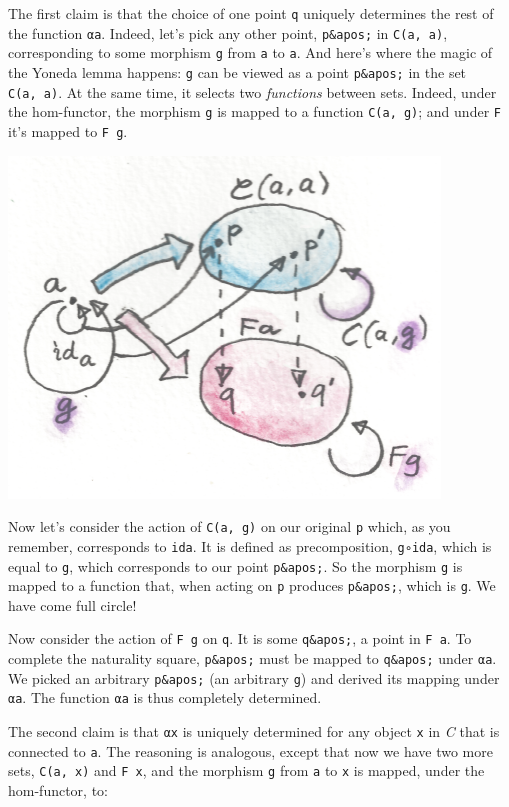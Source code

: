 The first claim is that the choice of one point \texttt{q} uniquely
determines the rest of the function \texttt{αa}. Indeed, let's pick any
other point, \texttt{p\&apos;} in \texttt{C(a,\ a)}, corresponding to
some morphism \texttt{g} from \texttt{a} to \texttt{a}. And here's where
the magic of the Yoneda lemma happens: \texttt{g} can be viewed as a
point \texttt{p\&apos;} in the set \texttt{C(a,\ a)}. At the same time,
it selects two \emph{functions} between sets. Indeed, under the
hom-functor, the morphism \texttt{g} is mapped to a function
\texttt{C(a,\ g)}; and under \texttt{F} it's mapped to \texttt{F\ g}.

\includegraphics{images/yoneda4.png}

Now let's consider the action of \texttt{C(a,\ g)} on our original
\texttt{p} which, as you remember, corresponds to \texttt{ida}. It is
defined as precomposition, \texttt{g∘ida}, which is equal to \texttt{g},
which corresponds to our point \texttt{p\&apos;}. So the morphism
\texttt{g} is mapped to a function that, when acting on \texttt{p}
produces \texttt{p\&apos;}, which is \texttt{g}. We have come full
circle!

Now consider the action of \texttt{F\ g} on \texttt{q}. It is some
\texttt{q\&apos;}, a point in \texttt{F\ a}. To complete the naturality
square, \texttt{p\&apos;} must be mapped to \texttt{q\&apos;} under
\texttt{αa}. We picked an arbitrary \texttt{p\&apos;} (an arbitrary
\texttt{g}) and derived its mapping under \texttt{αa}. The function
\texttt{αa} is thus completely determined.

The second claim is that \texttt{αx} is uniquely determined for any
object \texttt{x} in \emph{C} that is connected to \texttt{a}. The
reasoning is analogous, except that now we have two more sets,
\texttt{C(a,\ x)} and \texttt{F\ x}, and the morphism \texttt{g} from
\texttt{a} to \texttt{x} is mapped, under the hom-functor, to:

